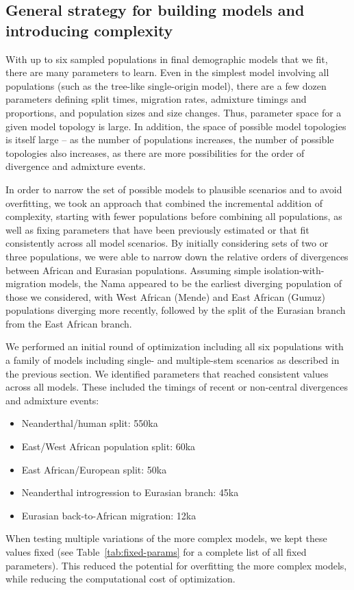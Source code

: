 \documentclass[]{article}
\begin{document}
\subsection{General strategy for building models and introducing complexity}
\label{sec:models}

With up to six sampled populations in final demographic models that we fit,
there are many parameters to learn. Even in the simplest model involving all
populations (such as the tree-like single-origin model), there are a few dozen
parameters defining split times, migration rates, admixture timings and
proportions, and population sizes and size changes. Thus, parameter space for a
given model topology is large. In addition, the space of possible model
topologies is itself large – as the number of populations increases, the number
of possible topologies also increases, as there are more possibilities for the
order of divergence and admixture events. 

In order to narrow the set of possible models to plausible scenarios and to
avoid overfitting, we took an approach that combined the incremental addition
of complexity, starting with fewer populations before combining all
populations, as well as fixing parameters that have been previously estimated
or that fit consistently across all model scenarios. By initially considering
sets of two or three populations, we were able to narrow down the relative
orders of divergences between African and Eurasian populations. Assuming simple
isolation-with-migration models, the Nama appeared to be the earliest diverging
population of those we considered, with West African (Mende) and East African
(Gumuz) populations diverging more recently, followed by the split of the
Eurasian branch from the East African branch.

We performed an initial round of optimization including all six populations
with a family of models including single- and multiple-stem scenarios as
described in the previous section. We identified parameters that reached
consistent values across all models. These included the timings of recent or
non-central divergences and admixture events:
\begin{itemize}
    \item Neanderthal/human split: 550ka
    \item East/West African population split: 60ka
    \item East African/European split: 50ka
    \item Neanderthal introgression to Eurasian branch: 45ka
    \item Eurasian back-to-African migration: 12ka
\end{itemize}
When testing multiple variations of the more complex models, we kept these
values fixed (see Table~\ref{tab:fixed-params} for a complete list of all fixed
parameters). This reduced the potential for overfitting the more complex
models, while reducing the computational cost of optimization.
\end{document}
